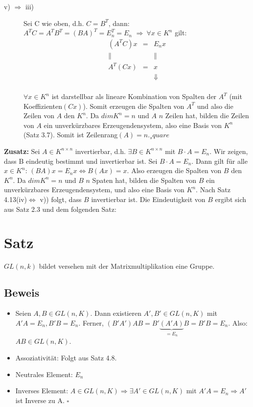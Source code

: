 \documentclass{scrbook}
\begin{document}
\begin{description}
\item[v) $\Rightarrow$ iii)] Sei C wie oben, d.h. $C = B^T$, dann: \\$A^TC=A^TB^T=(BA)^T = E_n^T =E_n$ $\Rightarrow \ \forall x \in K^n$ gilt:\\\[\begin{array}{ccc}
(A^TC)x&=&E_nx\\
\parallel&&\parallel\\
A^T(Cx)&=&x\\
&&\Downarrow
\end{array}\]\\
$ \forall x \in K^n$ ist darstellbar als lineare Kombination von Spalten der $A^T$ (mit Koeffizienten$(Cx)$). Somit erzeugen die Spalten von $A^T$ und also die Zeilen von $A$ den $K^n$. Da $dim K^n =n$ und $A$ $n$ Zeilen hat, bilden die Zeilen von $A$ ein unverkürzbares Erzeugendensystem, also eine Basis von $K^n$ (Satz 3.7). Somit ist Zeilenrang$(A)=n$.$_square$
\end{description}
\textbf{Zusatz:} Sei $A \in K^{n\times n}$ invertierbar, d.h. $\exists B\in K^{n \times n}$ mit $B\cdot A = E_n$. Wir zeigen, dass B eindeutig bestimmt und invertierbar ist. Sei $B\cdot A = E_n$. Dann gilt für alle $x \in K^n$: $(BA)x=E_nx \Leftrightarrow B(Ax)=x$. Also erzeugen die Spalten von $B$ den $K^n$. Da $dim K^n = n$ und $B$ $n$ Spaten hat, bilden die Spalten von $B$ ein unverkürzbares Erzeugendensystem, und also eine Basis von $K^n$. Nach Satz 4.13(iv)$\Leftrightarrow$ v)) folgt, dass $B$ invertierbar ist. Die Eindeutigkeit von $B$ ergibt sich aus Satz 2.3 und dem folgenden Satz:
\section{Satz}
$GL(n,k)$ bildet versehen mit der Matrixmultiplikation eine Gruppe.
\subsection*{Beweis}
\begin{itemize}
\item Seien $A,B \in GL(n,K)$. Dann existieren $A',B' \in GL(n,K)$ mit $A'A =E_n, B'B=E_n$. Ferner, $(B'A')AB = B'\underbrace{(A'A)}_{=E_n}B = B'B = E_n$. Also: $AB \in GL(n,K)$.
\item Assoziativität: Folgt aus Satz 4.8.
\item Neutrales Element: $E_n$
\item Inverses Element: $A\in GL(n,K)\Rightarrow \exists A'\in GL(n,K)$ mit $A'A = E_n \Rightarrow A'$ ist Inverse zu A. $\square$
\end{itemize}
\end{document}
